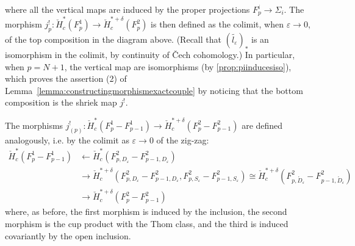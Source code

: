 \documentclass[a4paper]{amsart}
\newcommand{\lra}{\longrightarrow}
\theoremstyle{plain}
\theoremstyle{definition}
\newcommand{\CCH}{\check{H}_{c}}
\begin{document}
where all the vertical maps are induced by the proper projections $F^i_p \to \Sigma_i$.
The morphism $j^!_p \colon \CCH^*(F^1_p) \to \CCH^{*+\delta}(F^2_p)$ is then defined as the colimit, when $\varepsilon \to 0$, of the top composition in the diagram above. (Recall that $(\tilde{l_\varepsilon})_*$ is an isomorphism in the colimit, by continuity of \v{C}ech cohomology.) In particular, when $p = N+1$, the vertical map are isomorphisms (by \ref{prop:piinducesiso}), which proves the assertion (2) of Lemma~\ref{lemma:constructingmorphismexactcouple} by noticing that the bottom composition is the shriek map $j^!$.



\bigskip

The morphisms $j^!_{(p)} \colon \CCH^*(F^1_p - F^1_{p-1}) \to \CCH^{*+\delta}(F^2_p - F^2_{p-1})$ are defined analogously, i.e. by the colimit as $\varepsilon \to 0$ of the zig-zag:
\begin{equation*}
\begin{split}
    \CCH^*(F^1_p - F^1_{p-1}) &\longleftarrow \CCH^*(F^2_{p,D_\varepsilon} - F^2_{p-1,D_\varepsilon}) \\
        &\lra \CCH^{*+\delta}(F^2_{p,D_\varepsilon} - F^2_{p-1,D_\varepsilon}, F^2_{p,S_\varepsilon} - F^2_{p-1,S_\varepsilon}) \cong \CCH^{*+\delta}(F^2_{p,\mathring{D}_\varepsilon} - F^2_{p-1,\mathring{D}_\varepsilon}) \\
        &\lra \CCH^{*+\delta}(F^2_p - F^2_{p-1})
\end{split}
\end{equation*}
where, as before, the first morphism is induced by the inclusion, the second morphism is the cup product with the Thom class, and the third is induced covariantly by the open inclusion.

\bigskip
\end{document}

